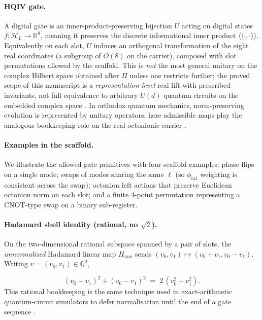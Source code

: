 \documentclass[11pt,a4paper]{article}
\theoremstyle{remark}
\begin{document}
\paragraph{HQIV gate.}
A digital gate is an inner-product-preserving bijection $U$ acting on digital states $f:\mathcal{H}_L\to\mathbb{R}^8$, meaning it preserves the discrete informational inner product $\langle\!\langle\cdot,\cdot\rangle\!\rangle$. Equivalently on each slot, $U$ induces an orthogonal transformation of the eight real coordinates (a subgroup of $O(8)$ on the carrier), composed with slot permutations allowed by the scaffold. This is \emph{not} the most general unitary on the complex Hilbert space obtained after $\Pi$ unless one restricts further; the proved scope of this manuscript is a \emph{representation-level} real lift with prescribed invariants, not full equivalence to arbitrary $U(d)$ quantum circuits on the embedded complex space \cite{vonNeumann1955,dirac1930}. In orthodox quantum mechanics, norm-preserving evolution is represented by unitary operators; here admissible maps play the analogous bookkeeping role on the real octonionic carrier \cite{freedman2019}.

\paragraph{Examples in the scaffold.}
We illustrate the allowed gate primitives with four scaffold examples: phase flips on a single mode; swaps of modes sharing the same $\ell$ (so $\phi_{\mathrm{rat}}$ weighting is consistent across the swap); octonion left actions that preserve Euclidean octonion norm on each slot; and a finite $4$-point permutation representing a CNOT-type swap on a binary sub-register.

\paragraph{Hadamard shell identity (rational, no $\sqrt{2}$).}
On the two-dimensional rational subspace spanned by a pair of slots, the \emph{unnormalized} Hadamard linear map $H_{\mathrm{raw}}$ sends $(v_0,v_1)\mapsto(v_0+v_1,v_0-v_1)$. Writing $v=(v_0,v_1)\in\mathbb{Q}^2$,

\begin{equation}
  (v_0+v_1)^2 + (v_0-v_1)^2 \;=\; 2\,(v_0^2+v_1^2).
\end{equation}
This rational bookkeeping is the same technique used in exact-arithmetic quantum-circuit simulators to defer normalisation until the end of a gate sequence \cite{smith2019exact}.
\end{document}
